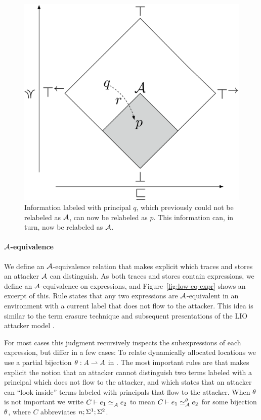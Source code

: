 \begin{figure}
    \centering
    \includegraphics[scale=0.20]{Illustrations/bad-flow.pdf}
    \caption{Information labeled with principal $q$, which previously could not be relabeled as $\mathcal{A}$, can now be relabeled as $p$. This information can, in turn, now be relabeled as $\mathcal{A}$.}
    \label{fig:bad-release}
\end{figure}

\paragraph{$\mathcal{A}$-equivalence}
We define an $\mathcal{A}$-equivalence relation that makes explicit which traces and stores an attacker $\mathcal{A}$ can distinguish. As both traces and stores contain expressions, we define an $\mathcal{A}$-equivalence on expressions, and Figure~\ref{fig:low-eq-expr} shows an excerpt of this. Rule  states that any two expressions are $\mathcal{A}$-equivalent in an environment with a current label that does not flow to the attacker. This idea is similar to the term erasure technique \cite{SRMMlio} and subsequent presentations of the LIO attacker model \cite{Stefan:2012:ACT:2364527.2364557, 10.1007/978-3-642-40203-6_40, 10.1007/978-3-319-24858-5_13}.

For most cases this judgment recursively inspects the subexpressions of each expression, but differ in a few cases: To relate dynamically allocated locations we use a partial bijection \cite{Banerjee:2002:SIF:794201.795164, Rajani2018} $\theta: A \rightharpoonup A$ in . The most important rules are  that makes explicit the notion that an attacker cannot distinguish two terms labeled with a principal which does not flow to the attacker, and  which states that an attacker can ``look inside'' terms labeled with principals that flow to the attacker. When $\theta$ is not important we write $\loweq{C}{\Attacker}{\expr_1}{\expr_2}$ to mean $\loweq{C}{\Attacker}[\bijection]{\expr_1}{\expr_2}$ for some bijection $\theta$, where $C$ abbreviates $n; \Sigma^1; \Sigma^2$.


